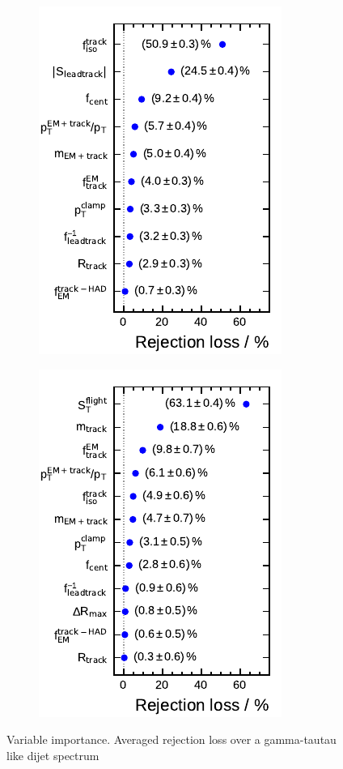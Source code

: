 \begin{figure}[ht]
  \begin{subfigure}[t]{0.33\textwidth}
    \centering
    \includegraphics{./figures/bdt_perf/var_importance/1p_iter1.pdf}
  \end{subfigure}
  \begin{subfigure}[t]{0.33\textwidth}
    \centering
    \includegraphics{./figures/bdt_perf/var_importance/3p_iter1.pdf}
  \end{subfigure}
  \caption{Variable importance. Averaged rejection loss over a gamma-tautau like
    dijet spectrum}
  \label{fig:variable_importance}
\end{figure}

